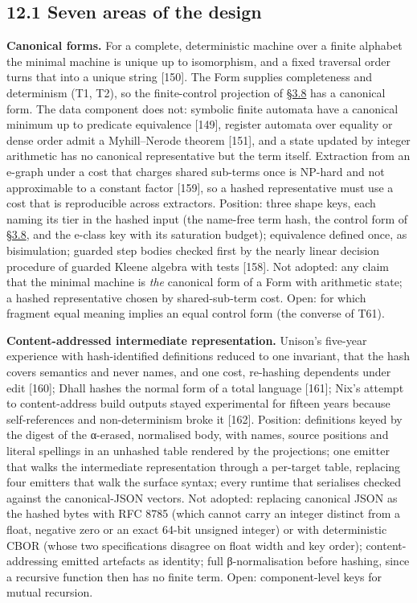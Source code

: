 \documentclass[10pt,letterpaper]{article}
\begin{document}
\subsection{12.1 Seven areas of the
design}\label{seven-areas-of-the-design}

\textbf{Canonical forms.} For a complete, deterministic machine over a
finite alphabet the minimal machine is unique up to isomorphism, and a
fixed traversal order turns that into a unique string {[}150{]}. The
Form supplies completeness and determinism (T1, T2), so the
finite-control projection of
\href{https://research.openie.dev/papers/rce/\#38-behaviour-equivalence-and-dimension}{§3.8}
has a canonical form. The data component does not: symbolic finite
automata have a canonical minimum up to predicate equivalence {[}149{]},
register automata over equality or dense order admit a Myhill--Nerode
theorem {[}151{]}, and a state updated by integer arithmetic has no
canonical representative but the term itself. Extraction from an e-graph
under a cost that charges shared sub-terms once is NP-hard and not
approximable to a constant factor {[}159{]}, so a hashed representative
must use a cost that is reproducible across extractors. Position: three
shape keys, each naming its tier in the hashed input (the name-free term
hash, the control form of
\href{https://research.openie.dev/papers/rce/\#38-behaviour-equivalence-and-dimension}{§3.8},
and the e-class key with its saturation budget); equivalence defined
once, as bisimulation; guarded step bodies checked first by the nearly
linear decision procedure of guarded Kleene algebra with tests
{[}158{]}. Not adopted: any claim that the minimal machine is \emph{the}
canonical form of a Form with arithmetic state; a hashed representative
chosen by shared-sub-term cost. Open: for which fragment equal meaning
implies an equal control form (the converse of T61).

\textbf{Content-addressed intermediate representation.} Unison's
five-year experience with hash-identified definitions reduced to one
invariant, that the hash covers semantics and never names, and one cost,
re-hashing dependents under edit {[}160{]}; Dhall hashes the normal form
of a total language {[}161{]}; Nix's attempt to content-address build
outputs stayed experimental for fifteen years because self-references
and non-determinism broke it {[}162{]}. Position: definitions keyed by
the digest of the α-erased, normalised body, with names, source
positions and literal spellings in an unhashed table rendered by the
projections; one emitter that walks the intermediate representation
through a per-target table, replacing four emitters that walk the
surface syntax; every runtime that serialises checked against the
canonical-JSON vectors. Not adopted: replacing canonical JSON as the
hashed bytes with RFC 8785 (which cannot carry an integer distinct from
a float, negative zero or an exact 64-bit unsigned integer) or with
deterministic CBOR (whose two specifications disagree on float width and
key order); content-addressing emitted artefacts as identity; full
β-normalisation before hashing, since a recursive function then has no
finite term. Open: component-level keys for mutual recursion.
\end{document}
